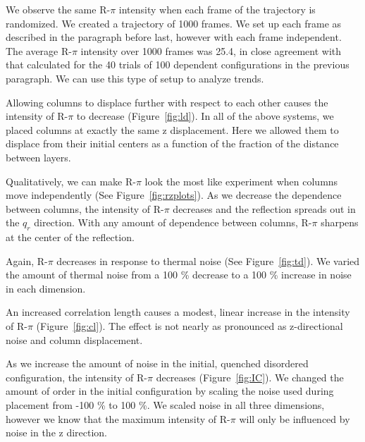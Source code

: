 \documentclass{article}
\begin{document}
  We observe the same R-$\pi$ intensity when each frame of the trajectory is
  randomized. We created a trajectory of 1000 frames. We set up each frame as
  described in the paragraph before last, however with each frame independent. The
  average R-$\pi$ intensity over 1000 frames was 25.4, in close agreement with
  that calculated for the 40 trials of 100 dependent configurations in the
  previous paragraph. We can use this type of setup to analyze trends.  

  Allowing columns to displace further with respect to each other causes the
  intensity of R-$\pi$ to decrease (Figure~\ref{fig:ld}). In all of the above
  systems, we placed columns at exactly the same z displacement. Here we allowed
  them to displace from their initial centers as a function of the fraction of
  the distance between layers.

  Qualitatively, we can make R-$\pi$ look the most like experiment when columns
  move independently (See Figure~\ref{fig:rzplots}). As we decrease the
  dependence between columns, the intensity of R-$\pi$ decreases and the
  reflection spreads out in the $q_r$ direction. With any amount of dependence
  between columns, R-$\pi$ sharpens at the center of the reflection. 

  Again, R-$\pi$ decreases in response to thermal noise (See 
  Figure~\ref{fig:td}). We varied the amount of thermal noise from a 100 \%
  decrease to a 100 \% increase in noise in each dimension.

  An increased correlation length causes a modest, linear increase in the
  intensity of R-$\pi$ (Figure~\ref{fig:cl}). The effect is not nearly as
  pronounced as z-directional noise and column displacement.

  As we increase the amount of noise in the initial, quenched disordered
  configuration, the intensity of R-$\pi$ decreases (Figure~\ref{fig:IC}).  We
  changed the amount of order in the initial configuration by scaling the noise
  used during placement from -100 \% to 100 \%. We scaled noise in all three
  dimensions, however we know that the maximum intensity of R-$\pi$ will only be
  influenced by noise in the z direction.
\end{document}
